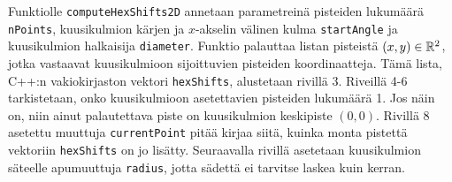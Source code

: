 Funktiolle \texttt{computeHexShifts2D} annetaan parametreinä pisteiden lukumäärä \texttt{nPoints}, kuusikulmion kärjen ja $x$-akselin välinen kulma \texttt{startAngle} ja kuusikulmion halkaisija \texttt{diameter}. Funktio palauttaa listan pisteistä $(x, y)\in\mathbb{R}^2$, jotka vastaavat kuusikulmioon sijoittuvien pisteiden koordinaatteja. Tämä lista, C++:n vakiokirjaston vektori \texttt{hexShifts}, alustetaan rivillä 3. Riveillä 4-6 tarkistetaan, onko kuusikulmioon asetettavien pisteiden lukumäärä 1. Jos näin on, niin ainut palautettava piste on kuusikulmion keskipiste $(0, 0)$. Rivillä 8 asetettu muuttuja \texttt{currentPoint} pitää kirjaa siitä, kuinka monta pistettä vektoriin \texttt{hexShifts} on jo lisätty. Seuraavalla rivillä asetetaan kuusikulmion säteelle apumuuttuja \texttt{radius}, jotta sädettä ei tarvitse laskea kuin kerran.

